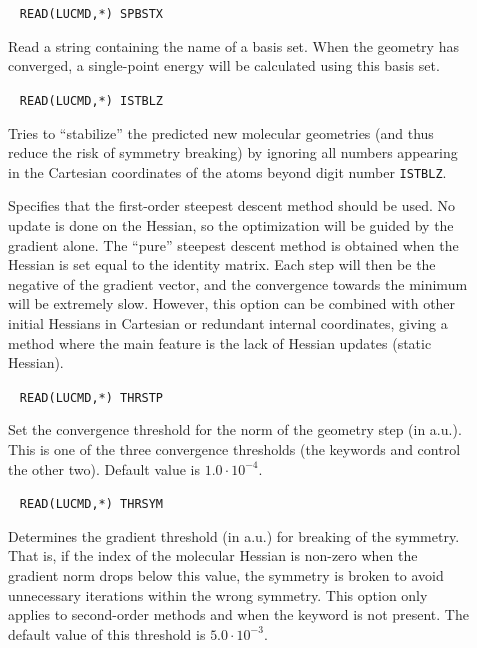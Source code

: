 \begin{description}
\item[]\verb| |
\newline
\verb|READ(LUCMD,*) SPBSTX|

Read a string containing the name of a basis set. When the geometry
has converged, a single-point energy will be calculated using this
basis set.

\item[]\verb| |
\newline
\verb|READ(LUCMD,*) ISTBLZ|

Tries to ``stabilize'' the predicted new molecular geometries (and
thus reduce the risk of symmetry breaking) by ignoring all numbers
appearing in the Cartesian coordinates of the atoms beyond digit
number \verb|ISTBLZ|.

\item[]
Specifies that the first-order steepest descent method should be
used. No update is done on the Hessian, so the optimization will be
guided by the gradient alone. The ``pure'' steepest descent method is
obtained when the Hessian is set equal to the identity matrix. Each
step will then be the negative of the gradient vector, and the
convergence towards the minimum will be extremely slow. However, this
option can be combined with other initial Hessians in Cartesian or
redundant internal coordinates, giving a method
where the main feature is the lack of Hessian updates (static
Hessian).

\item[]\verb| |
\newline
\verb|READ(LUCMD,*) THRSTP|

Set the convergence threshold for
the norm of the geometry step (in a.u.).
This is one of the three convergence thresholds (the keywords  and
 control the other two). Default value is $1.0\cdot
10^{-4}$.

\item[]\verb| |
\newline
\verb|READ(LUCMD,*) THRSYM|

Determines the gradient threshold (in a.u.) for breaking of the
symmetry. That is, if the index of the
molecular Hessian is non-zero when the gradient norm
drops below this value, the symmetry is broken to avoid unnecessary
iterations within the wrong symmetry. This option only applies to
second-order methods and when the
keyword  is not present. The default value of this
threshold is $5.0\cdot 10^{-3}$.


\end{description}
